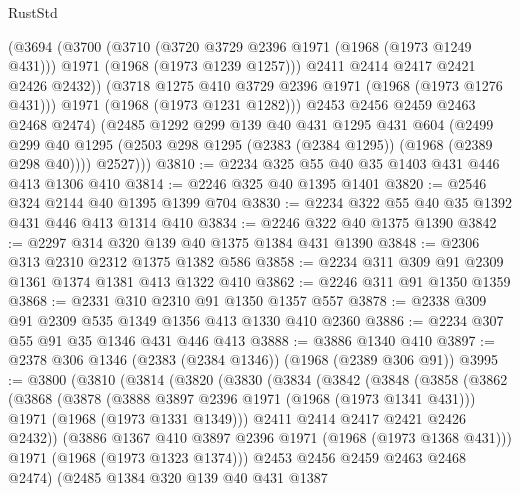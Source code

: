 \begin{lexlean}{RustStd}
\begin{coremodule}
{\begin{coremodule}
{{{{{            (@3694
              (@3700
                (@3710
                  (@3720 @3729 @2396 @1971 (@1968 (@1973 @1249 @431)))
                  @1971
                  (@1968 (@1973 @1239 @1257)))
                @2411
                @2414
                @2417
                @2421
                @2426
                @2432))
            (@3718 @1275 @410 @3729 @2396 @1971 (@1968 (@1973 @1276 @431)))
            @1971
            (@1968 (@1973 @1231 @1282)))
          @2453
          @2456
          @2459
          @2463
          @2468
          @2474)
        (@2485
          @1292
          @299
          @139
          @40
          @431
          @1295
          @431
          @604
          (@2499 @299 @40 @1295 (@2503 @298 @1295 (@2383 (@2384 @1295)) (@1968 (@2389 @298 @40))))
          @2527)))
@3810 := @2234 @325 @55 @40 @35 @1403 @431 @446 @413 @1306 @410
@3814 := @2246 @325 @40 @1395 @1401
@3820 := @2546 @324 @2144 @40 @1395 @1399 @704
@3830 := @2234 @322 @55 @40 @35 @1392 @431 @446 @413 @1314 @410
@3834 := @2246 @322 @40 @1375 @1390
@3842 := @2297 @314 @320 @139 @40 @1375 @1384 @431 @1390
@3848 := @2306 @313 @2310 @2312 @1375 @1382 @586
@3858 := @2234 @311 @309 @91 @2309 @1361 @1374 @1381 @413 @1322 @410
@3862 := @2246 @311 @91 @1350 @1359
@3868 := @2331 @310 @2310 @91 @1350 @1357 @557
@3878 := @2338 @309 @91 @2309 @535 @1349 @1356 @413 @1330 @410 @2360
@3886 := @2234 @307 @55 @91 @35 @1346 @431 @446 @413
@3888 := @3886 @1340 @410
@3897 := @2378 @306 @1346 (@2383 (@2384 @1346)) (@1968 (@2389 @306 @91))
@3995 := @3800
    (@3810
      (@3814
        (@3820
          (@3830
            (@3834
              (@3842
                (@3848
                  (@3858
                    (@3862
                      (@3868
                        (@3878
                          (@3888 @3897 @2396 @1971 (@1968 (@1973 @1341 @431)))
                          @1971
                          (@1968 (@1973 @1331 @1349)))
                        @2411
                        @2414
                        @2417
                        @2421
                        @2426
                        @2432))
                    (@3886 @1367 @410 @3897 @2396 @1971 (@1968 (@1973 @1368 @431)))
                    @1971
                    (@1968 (@1973 @1323 @1374)))
                  @2453
                  @2456
                  @2459
                  @2463
                  @2468
                  @2474)
                (@2485
                  @1384
                  @320
                  @139
                  @40
                  @431
                  @1387
}}}}}
\end{coremodule}}
\end{coremodule}
\end{lexlean}
